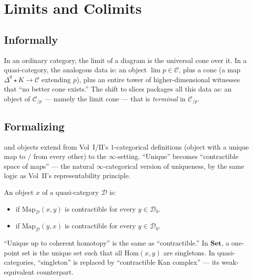 \section{Limits and Colimits}
\label{sec:limits-colimits-qcat}

\subsection{Informally}

In an ordinary category, the limit of a diagram is the universal cone
over it. In a quasi-category, the analogous data is: an object
$\lim p \in \mathcal{C}$, plus a cone (a map $\Delta^0 \star K \to
\mathcal{C}$ extending $p$), plus an entire tower of higher-dimensional
witnesses that ``no better cone exists.'' The shift to slices packages
all this data as: an object of $\mathcal{C}_{/p}$ — namely the limit cone
— that is \emph{terminal} in $\mathcal{C}_{/p}$.

\subsection{Formalizing}

\begin{nameorigin}
 and  objects extend from Vol~I/II's
$1$-categorical definitions (object with a unique map to / from every
other) to the $\infty$-setting. ``Unique'' becomes ``contractible space
of maps'' — the natural $\infty$-categorical version of uniqueness, by
the same logic as Vol~II's representability principle.
\end{nameorigin}

\begin{definition}
\label{def:initial-terminal-qcat}
An object $x$ of a quasi-category $\mathcal{D}$ is:
\begin{itemize}
  \item {} if $\mathrm{Map}_\mathcal{D}(x, y)$ is contractible
        for every $y \in \mathcal{D}_0$.
  \item {} if $\mathrm{Map}_\mathcal{D}(y, x)$ is contractible
        for every $y \in \mathcal{D}_0$.
\end{itemize}
\end{definition}

\begin{remark}
``Unique up to coherent homotopy'' is the same as ``contractible.'' In
$\mathbf{Set}$, a one-point set is the unique set such that all
$\mathrm{Hom}(x, y)$ are singletons. In quasi-categories, ``singleton''
is replaced by ``contractible Kan complex'' — its weak-equivalent counterpart.
\end{remark}

